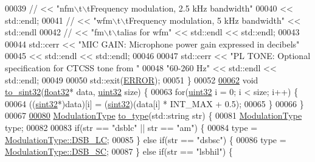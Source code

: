 \begin{DoxyCode}
00039 \textcolor{comment}{//          << "nfm\(\backslash\)t\(\backslash\)tFrequency modulation, 2.5 kHz bandwidth"}
00040             << std::endl;
00041 \textcolor{comment}{//          << "wfm\(\backslash\)t\(\backslash\)tFrequency modulation, 5 kHz bandwidth" << std::endl}
00042 \textcolor{comment}{//          << "fm\(\backslash\)t\(\backslash\)talias for wfm" << std::endl << std::endl;}
00043 
00044         std::cerr << \textcolor{stringliteral}{"MIC GAIN: Microphone power gain expressed in decibels"}
00045         << std::endl << std::endl;
00046 
00047         std::cerr << \textcolor{stringliteral}{"PL TONE: Optional specification for CTCSS tone from "}
00048             \textcolor{stringliteral}{"60-260 Hz"} << std::endl << std::endl;
00049 
00050         std::exit(\hyperlink{definitions_8hpp_a8fe83ac76edc595f6b98cd4a4127aed5}{ERROR});
00051     \}
00052 
\hypertarget{auxiliary_8hpp_source_l00062}{}\hyperlink{namespaceradio_ae4b2334c4366dcdf0311ad79d2067945}{00062}     \textcolor{keywordtype}{void} \hyperlink{namespaceradio_ae4b2334c4366dcdf0311ad79d2067945}{to\_sint32}(\hyperlink{definitions_8hpp_aacdc525d6f7bddb3ae95d5c311bd06a1}{float32}* data, \hyperlink{definitions_8hpp_a1134b580f8da4de94ca6b1de4d37975e}{uint32} size) \{
00063         \textcolor{keywordflow}{for}(\hyperlink{definitions_8hpp_a1134b580f8da4de94ca6b1de4d37975e}{uint32} i = 0; i < size; i++) \{
00064             ((\hyperlink{definitions_8hpp_a0573de65958b4fda3a0460ed417dafb8}{sint32}*)data)[i] = (\hyperlink{definitions_8hpp_a0573de65958b4fda3a0460ed417dafb8}{sint32})(data[i] * INT\_MAX + 0.5);
00065         \}
00066     \}
00067 
\hypertarget{auxiliary_8hpp_source_l00080}{}\hyperlink{namespaceradio_a402fe28e2e2bb2be7a0d2d9f74cc640d}{00080}     \hyperlink{namespaceradio_a46fb7299001138f28b7f69975c58399e}{ModulationType} \hyperlink{namespaceradio_a402fe28e2e2bb2be7a0d2d9f74cc640d}{to\_type}(std::string str) \{
00081         \hyperlink{namespaceradio_a46fb7299001138f28b7f69975c58399e}{ModulationType} type;
00082 
00083         \textcolor{keywordflow}{if}(str == \textcolor{stringliteral}{"dsblc"} || str == \textcolor{stringliteral}{"am"}) \{
00084             type = \hyperlink{namespaceradio_a46fb7299001138f28b7f69975c58399eaf180dafbc98f54c6382ae29243cec902}{ModulationType::DSB\_LC};
00085         \} \textcolor{keywordflow}{else} \textcolor{keywordflow}{if}(str == \textcolor{stringliteral}{"dsbsc"}) \{
00086             type = \hyperlink{namespaceradio_a46fb7299001138f28b7f69975c58399ea92c257208ae8b0c6d88c80abcf15ec31}{ModulationType::DSB\_SC};
00087         \} \textcolor{keywordflow}{else} \textcolor{keywordflow}{if}(str == \textcolor{stringliteral}{"lsbhil"}) \{

\end{DoxyCode}
